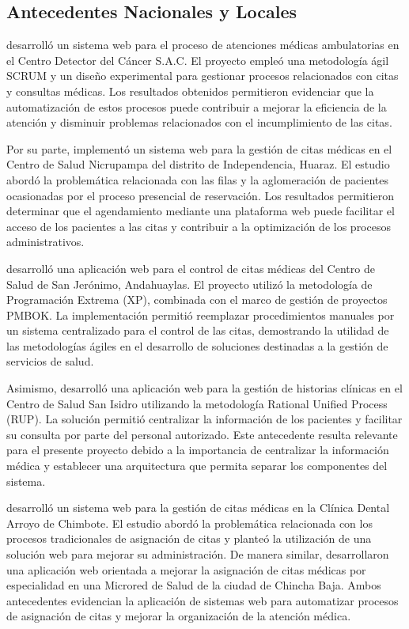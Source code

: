 \subsection{Antecedentes Nacionales y Locales}

\textcite{diaz2019} desarrolló un sistema web para el proceso de atenciones médicas ambulatorias en el Centro Detector del Cáncer S.A.C. El proyecto empleó una metodología ágil SCRUM y un diseño experimental para gestionar procesos relacionados con citas y consultas médicas. Los resultados obtenidos permitieron evidenciar que la automatización de estos procesos puede contribuir a mejorar la eficiencia de la atención y disminuir problemas relacionados con el incumplimiento de las citas.

Por su parte, \textcite{herrera2021} implementó un sistema web para la gestión de citas médicas en el Centro de Salud Nicrupampa del distrito de Independencia, Huaraz. El estudio abordó la problemática relacionada con las filas y la aglomeración de pacientes ocasionadas por el proceso presencial de reservación. Los resultados permitieron determinar que el agendamiento mediante una plataforma web puede facilitar el acceso de los pacientes a las citas y contribuir a la optimización de los procesos administrativos.

\textcite{nolasco2019} desarrolló una aplicación web para el control de citas médicas del Centro de Salud de San Jerónimo, Andahuaylas. El proyecto utilizó la metodología de Programación Extrema (XP), combinada con el marco de gestión de proyectos PMBOK. La implementación permitió reemplazar procedimientos manuales por un sistema centralizado para el control de las citas, demostrando la utilidad de las metodologías ágiles en el desarrollo de soluciones destinadas a la gestión de servicios de salud.

Asimismo, \textcite{quispe2018} desarrolló una aplicación web para la gestión de historias clínicas en el Centro de Salud San Isidro utilizando la metodología Rational Unified Process (RUP). La solución permitió centralizar la información de los pacientes y facilitar su consulta por parte del personal autorizado. Este antecedente resulta relevante para el presente proyecto debido a la importancia de centralizar la información médica y establecer una arquitectura que permita separar los componentes del sistema.

\textcite{valera2024} desarrolló un sistema web para la gestión de citas médicas en la Clínica Dental Arroyo de Chimbote. El estudio abordó la problemática relacionada con los procesos tradicionales de asignación de citas y planteó la utilización de una solución web para mejorar su administración. De manera similar, \textcite{mera2022} desarrollaron una aplicación web orientada a mejorar la asignación de citas médicas por especialidad en una Microred de Salud de la ciudad de Chincha Baja. Ambos antecedentes evidencian la aplicación de sistemas web para automatizar procesos de asignación de citas y mejorar la organización de la atención médica.

